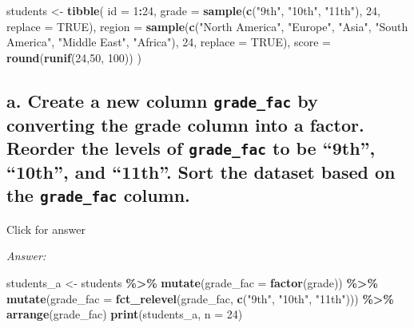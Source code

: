 \documentclass[
]{book}
\newenvironment{Shaded}{\begin{snugshade}}{\end{snugshade}}
\newcommand{\AttributeTok}[1]{\textcolor[rgb]{0.13,0.29,0.53}{#1}}
\newcommand{\ConstantTok}[1]{\textcolor[rgb]{0.56,0.35,0.01}{#1}}
\newcommand{\DecValTok}[1]{\textcolor[rgb]{0.00,0.00,0.81}{#1}}
\newcommand{\FunctionTok}[1]{\textcolor[rgb]{0.13,0.29,0.53}{\textbf{#1}}}
\newcommand{\NormalTok}[1]{#1}
\newcommand{\OtherTok}[1]{\textcolor[rgb]{0.56,0.35,0.01}{#1}}
\newcommand{\SpecialCharTok}[1]{\textcolor[rgb]{0.81,0.36,0.00}{\textbf{#1}}}
\newcommand{\StringTok}[1]{\textcolor[rgb]{0.31,0.60,0.02}{#1}}
\begin{document}
\begin{Shaded}
\begin{Highlighting}[]
\NormalTok{students }\OtherTok{\textless{}{-}} \FunctionTok{tibble}\NormalTok{(}
  \AttributeTok{id =} \DecValTok{1}\SpecialCharTok{:}\DecValTok{24}\NormalTok{,}
  \AttributeTok{grade =} \FunctionTok{sample}\NormalTok{(}\FunctionTok{c}\NormalTok{(}\StringTok{"9th"}\NormalTok{, }\StringTok{"10th"}\NormalTok{, }\StringTok{"11th"}\NormalTok{), }\DecValTok{24}\NormalTok{, }\AttributeTok{replace =} \ConstantTok{TRUE}\NormalTok{),}
  \AttributeTok{region =} \FunctionTok{sample}\NormalTok{(}\FunctionTok{c}\NormalTok{(}\StringTok{"North America"}\NormalTok{, }\StringTok{"Europe"}\NormalTok{, }\StringTok{"Asia"}\NormalTok{, }\StringTok{"South America"}\NormalTok{, }\StringTok{"Middle East"}\NormalTok{, }\StringTok{"Africa"}\NormalTok{), }\DecValTok{24}\NormalTok{, }\AttributeTok{replace =} \ConstantTok{TRUE}\NormalTok{),}
  \AttributeTok{score =} \FunctionTok{round}\NormalTok{(}\FunctionTok{runif}\NormalTok{(}\DecValTok{24}\NormalTok{,}\DecValTok{50}\NormalTok{, }\DecValTok{100}\NormalTok{))}
\NormalTok{)}
\end{Highlighting}
\end{Shaded}

\hypertarget{a.-create-a-new-column-grade_fac-by-converting-the-grade-column-into-a-factor.-reorder-the-levels-of-grade_fac-to-be-9th-10th-and-11th.-sort-the-dataset-based-on-the-grade_fac-column.}{%
\subsection{\texorpdfstring{a. Create a new column \texttt{grade\_fac} by converting the grade column into a factor. Reorder the levels of \texttt{grade\_fac} to be ``9th'', ``10th'', and ``11th''. Sort the dataset based on the \texttt{grade\_fac} column.}{a. Create a new column grade\_fac by converting the grade column into a factor. Reorder the levels of grade\_fac to be ``9th'', ``10th'', and ``11th''. Sort the dataset based on the grade\_fac column.}}\label{a.-create-a-new-column-grade_fac-by-converting-the-grade-column-into-a-factor.-reorder-the-levels-of-grade_fac-to-be-9th-10th-and-11th.-sort-the-dataset-based-on-the-grade_fac-column.}}

Click for answer

\emph{Answer:}

\begin{Shaded}
\begin{Highlighting}[]
\NormalTok{students\_a }\OtherTok{\textless{}{-}}\NormalTok{ students }\SpecialCharTok{\%\textgreater{}\%}
  \FunctionTok{mutate}\NormalTok{(}\AttributeTok{grade\_fac =} \FunctionTok{factor}\NormalTok{(grade)) }\SpecialCharTok{\%\textgreater{}\%}
  \FunctionTok{mutate}\NormalTok{(}\AttributeTok{grade\_fac =} \FunctionTok{fct\_relevel}\NormalTok{(grade\_fac, }\FunctionTok{c}\NormalTok{(}\StringTok{"9th"}\NormalTok{, }\StringTok{"10th"}\NormalTok{, }\StringTok{"11th"}\NormalTok{))) }\SpecialCharTok{\%\textgreater{}\%}
  \FunctionTok{arrange}\NormalTok{(grade\_fac) }
\FunctionTok{print}\NormalTok{(students\_a, }\AttributeTok{n =} \DecValTok{24}\NormalTok{)}
\end{Highlighting}
\end{Shaded}
\end{document}
